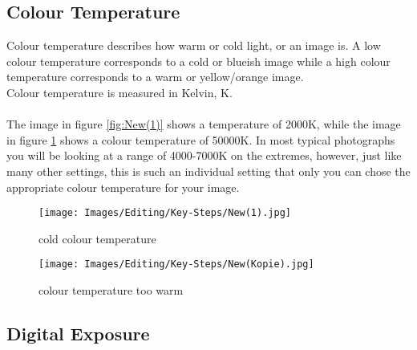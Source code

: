 \subsection{Colour Temperature}

Colour temperature describes how warm or cold light, or an image is. A low colour temperature corresponds to a cold or blueish image while a high colour temperature corresponds to a warm or yellow/orange image.
\\
Colour temperature is measured in Kelvin, K.
\\
\\
The image in figure \ref{fig:New(1)} shows a temperature of 2000K, while the image in figure \ref{fig:New(Kopie)} shows a colour temperature of 50000K. In most typical photographs you will be looking at a range of 4000-7000K on the extremes, however, just like many other settings, this is such an individual setting that only you can chose the appropriate colour temperature for your image.

\begin{figure}[htbp]
\begin{minipage}{.5\textwidth}
	\centering
		\texttt{[image: Images/Editing/Key-Steps/New(1).jpg]}
	\caption{cold colour temperature}
	\label{fig:New(1)}
\end{minipage}
\begin{minipage}{.5\textwidth}
	\centering
		\texttt{[image: Images/Editing/Key-Steps/New(Kopie).jpg]}
	\caption{colour temperature too warm}
	\label{fig:New(Kopie)}
\end{minipage}
\end{figure}


\subsection{Digital Exposure}

